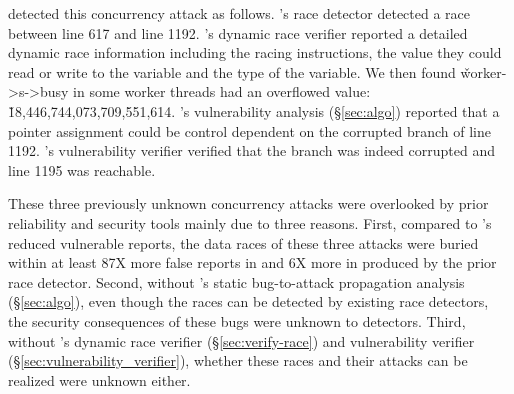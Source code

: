 \xxx detected this concurrency attack as follows. \xxx's race detector detected 
a race between line 617 and line 1192. \xxx's dynamic race verifier reported 
a detailed dynamic race information including the racing instructions, the 
value they could read or write to the variable and the type of the variable. 
We then found \v{worker->s->busy} in some worker threads had an overflowed 
value: \v{18,446,744,073,709,551,614}. \xxx's vulnerability analysis 
(\S\ref{sec:algo}) reported that a pointer assignment could be control dependent 
on the corrupted branch of line 1192. \xxx's vulnerability verifier verified 
that the branch was indeed corrupted and line 1195 was reachable.

These three previously unknown concurrency attacks were overlooked by 
prior reliability and security tools mainly due to three reasons. First, 
compared to \xxx's reduced vulnerable reports, the data races of these three 
attacks were buried within at least 87X more false reports in \apache and 6X 
more in \ssdb produced by the prior \tsan race detector. Second, without 
\xxx's static bug-to-attack propagation analysis (\S\ref{sec:algo}), even though 
the races can be detected by existing race detectors, the security 
consequences of these bugs were unknown to detectors. Third, without 
\xxx's dynamic race verifier (\S\ref{sec:verify-race}) and 
vulnerability verifier (\S\ref{sec:vulnerability_verifier}), whether these 
races and their attacks can be realized were unknown either.


